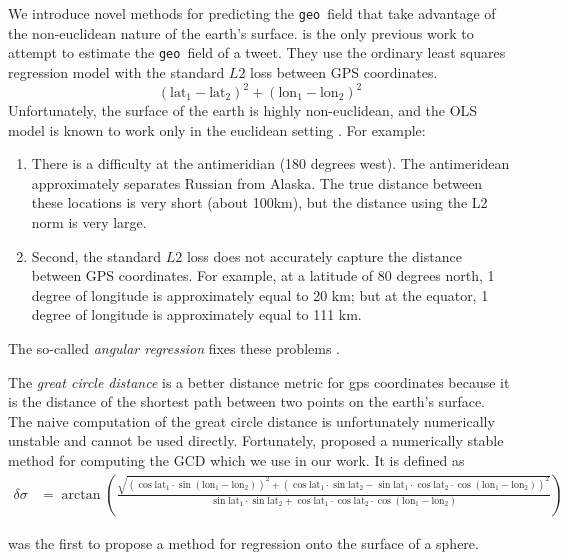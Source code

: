 \documentclass[sigconf,10pt]{acmart}
\newcommand{\tweetdata}[1]{{\texttt{#1}~}}
\newcommand{\geo          }{\tweetdata{geo}}
\newcommand{\lata}{\text{lat}_1}
\newcommand{\latb}{\text{lat}_2}
\newcommand{\latd}{(\lata-\latb)}
\newcommand{\lona}{\text{lon}_1}
\newcommand{\lonb}{\text{lon}_2}
\newcommand{\lond}{(\lona-\lonb)}
\begin{document}
We introduce novel methods for predicting the \geo field that take advantage of the non-euclidean nature of the earth's surface.
\citet{duong2016near} is the only previous work to attempt to estimate the \geo field of a tweet.
They use the ordinary least squares regression model with the standard $L2$ loss between GPS coordinates.
\begin{equation}
    \latd^2 + \lond^2
\end{equation}
Unfortunately, the surface of the earth is highly non-euclidean, 
and the OLS model is known to work only in the euclidean setting \citep[e.g.][]{fisher1992regression}.
For example:
\begin{enumerate}
    \item
        There is a difficulty at the antimeridian (180 degrees west).
        The antimeridean approximately separates Russian from Alaska.
        The true distance between these locations is very short (about 100km),
        but the distance using the L2 norm is very large.
    \item
        Second, the standard $L2$ loss does not accurately capture the distance between GPS coordinates.
        For example, at a latitude of 80 degrees north, 1 degree of longitude is approximately equal to 20 km;
        but at the equator, 1 degree of longitude is approximately equal to 111 km.
\end{enumerate}

The so-called \emph{angular regression} fixes these problems \citep{fisher1992regression}.

The \emph{great circle distance} is a better distance metric for gps coordinates because it is the distance of the shortest path between two points on the earth's surface.
The naive computation of the great circle distance is unfortunately numerically unstable and cannot be used directly.
Fortunately, \citet{vincenty1975direct} proposed a numerically stable method for computing the GCD which we use in our work.
It is defined as
\begin{align}
    \delta\sigma 
    &=
    \arctan\left(
        \frac
        {\sqrt{(\cos\lata\cdot\sin\lond)^2 + (\cos\lata\cdot\sin\latb-\sin\lata\cdot\cos\latb\cdot\cos\lond)^2}}
        {\sin\lata\cdot\sin\latb + \cos\lata\cdot\cos\latb\cdot\cos\lond}
    \right)
\end{align}

\citet{fisher1992regression} was the first to propose a method for regression onto the surface of a sphere.

\end{document}
